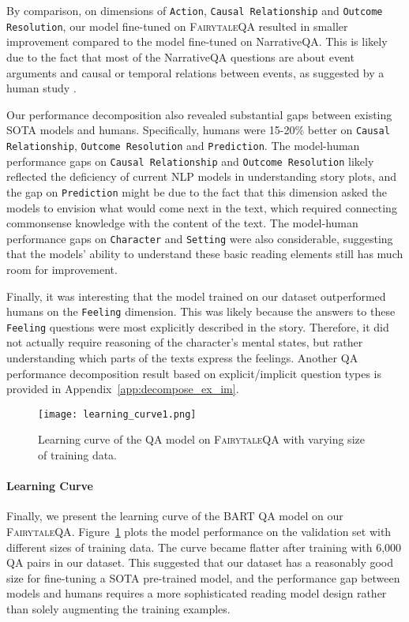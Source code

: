 \documentclass[11pt]{article}
\newcommand{\datasetname}{\textsc{FairytaleQA}\xspace}
\begin{document}
By comparison, on dimensions of \texttt{Action}, \texttt{Causal Relationship} and \texttt{Outcome Resolution}, our model fine-tuned on \datasetname resulted in smaller improvement compared to the model fine-tuned on NarrativeQA. This is likely due to the fact that most of the NarrativeQA questions are about event arguments and causal or temporal relations between events, as suggested by a human study \cite{mou2021narrative}.

Our performance decomposition also revealed substantial gaps between existing SOTA models and humans. Specifically, humans were 15-20\% better on \texttt{Causal Relationship}, \texttt{Outcome Resolution} and \texttt{Prediction}. The model-human performance gaps on \texttt{Causal Relationship} and \texttt{Outcome Resolution} likely reflected the deficiency of current NLP models in understanding story plots, and the gap on \texttt{Prediction} might be due to the fact that this dimension asked the models to envision what would come next in the text, which required connecting commonsense knowledge with the content of the text. The model-human performance gaps on \texttt{Character} and \texttt{Setting} were also considerable, suggesting that the models' ability to understand these basic reading elements still has much room for improvement. 

Finally, it was interesting that the model trained on our dataset outperformed humans on the \texttt{Feeling} dimension. This was likely because the answers to these \texttt{Feeling} questions were most explicitly described in the story. Therefore, it did not actually require reasoning of the character's mental states, but rather understanding which parts of the texts express the feelings. Another QA performance decomposition result based on explicit/implicit question types is provided in Appendix~\ref{app:decompose_ex_im}.


\begin{figure}[t]
    \centering
    \texttt{[image: learning\_curve1.png]}
    \vspace{-5pt}
    \caption{\small{Learning curve of the QA model on \datasetname with varying size of training data.}}
    \label{fig:learning_curve}
\end{figure}
\vspace{-5pt}

\paragraph{Learning Curve}
Finally, we present the learning curve of the BART QA model on our \datasetname. Figure~\ref{fig:learning_curve} plots the model performance on the validation set with different sizes of training data.
The curve became flatter after training with 6,000 QA pairs in our dataset. This suggested that our dataset has a reasonably good size for fine-tuning a SOTA pre-trained model, and the performance gap between models and humans requires a more sophisticated reading model design rather than solely augmenting the training examples.
\end{document}
